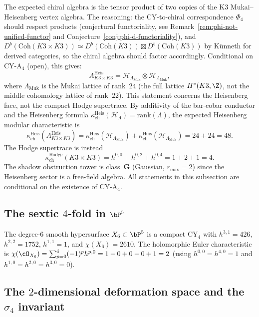 The expected chiral algebra is the tensor product of two copies of the K3 Mukai--Heisenberg vertex algebra. The reasoning: the CY-to-chiral correspondence $\Phi_4$ should respect products (conjectural functoriality, see Remark~\ref{rem:phi-not-unified-functor} and Conjecture~\ref{conj:phi-d-functoriality}), and $D^b(\mathrm{Coh}(K3 \times K3)) \simeq D^b(\mathrm{Coh}(K3)) \boxtimes D^b(\mathrm{Coh}(K3))$ by K\"unneth for derived categories, so the chiral algebra should factor accordingly. Conditional on CY-A$_4$ (open), this gives:
\[
 A_{K3 \times K3}^{\mathrm{Heis}} =
 \mathcal H_{\Lambda_{\mathrm{Muk}}} \otimes
 \mathcal H_{\Lambda_{\mathrm{Muk}}},
\]
where $\Lambda_{\mathrm{Muk}}$ is the Mukai lattice of rank~$24$ (the full lattice $H^*(K3, \Z)$, not the middle cohomology lattice of rank~$22$). This statement concerns the Heisenberg face, not the compact Hodge supertrace. By additivity of the bar-cobar conductor and the Heisenberg formula $\kappa_{\mathrm{ch}}^{\mathrm{Heis}}(\mathcal H_\Lambda) = \mathrm{rank}(\Lambda)$, the expected Heisenberg modular characteristic is
\[
 \kappa_{\mathrm{ch}}^{\mathrm{Heis}}(A_{K3 \times K3}^{\mathrm{Heis}})
 = \kappa_{\mathrm{ch}}^{\mathrm{Heis}}(\mathcal H_{\Lambda_{\mathrm{Muk}}})
 + \kappa_{\mathrm{ch}}^{\mathrm{Heis}}(\mathcal H_{\Lambda_{\mathrm{Muk}}})
 = 24 + 24 = 48.
\]
The Hodge supertrace is instead
\[
 \kappa_{\mathrm{ch}}^{\mathrm{Hodge}}(K3\times K3)
 = h^{0,0}+h^{0,2}+h^{0,4}
 = 1+2+1 = 4.
\]
The shadow obstruction tower is class~$\mathbf{G}$ (Gaussian, $r_{\max} = 2$) since the Heisenberg sector is a free-field algebra. All statements in this subsection are conditional on the existence of CY-A$_4$.


\subsection{The sextic \texorpdfstring{$4$}{4}-fold in \texorpdfstring{$\bP^5$}{P-5}}
\label{subsec:sextic}

The degree-$6$ smooth hypersurface $X_6 \subset \bP^5$ is a compact CY$_4$ with $h^{3,1} = 426$, $h^{2,2} = 1752$, $h^{1,1} = 1$, and $\chi(X_6) = 2610$. The holomorphic Euler characteristic is $\chi(\cO_{X_6}) = \sum_{p=0}^{4} (-1)^p h^{p,0} = 1 - 0 + 0 - 0 + 1 = 2$ (using $h^{0,0} = h^{4,0} = 1$ and $h^{1,0} = h^{2,0} = h^{3,0} = 0$).


\subsection{The \texorpdfstring{$2$}{2}-dimensional deformation space and the \texorpdfstring{$\sigma_4$}{sigma-4} invariant}
\label{subsec:cy4-deformation-space}

